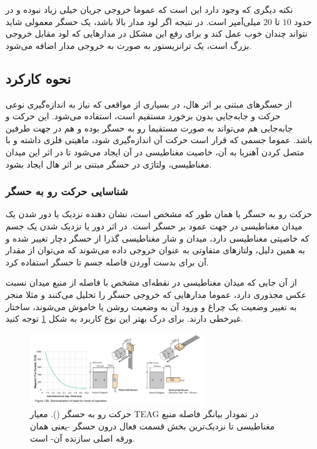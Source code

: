 \documentclass[conference]{IEEEtran-ModifiedForMVIP}
\begin{document}
نکته دیگری که وجود دارد این است که عموما خروجی جریان خیلی زیاد نبوده و در حدود $10$ تا $20$ میلی‌آمپر است. در نتیجه اگر لود مدار بالا باشد، یک حسگر معمولی شاید نتواند چندان خوب عمل کند و برای رفع این مشکل در مدار‌هایی که لود مقابل خروجی بزرگ است، یک ترانزیستور  به صورت  به خروجی مدار اضافه می‌شود. 	\cite{ele_hall_2013}


\subsection{نحوه کارکرد}

از حسگر‌های مبتنی بر اثر هال، در بسیاری از مواقعی که نیاز به اندازه‌گیری نوعی حرکت و جابه‌جایی بدون برخورد مستقیم است، استفاده می‌شود. این حرکت و جا‌به‌جایی هم می‌تواند به صورت مستقیما رو به حسگر بوده و هم در جهت طرفین باشد. عموما جسمی که قرار است حرکت‌ آن اندازه‌گیری شود، ماهیتی فلزی داشته و با متصل کردن آهنربا به آن، خاصیت مغناطیسی در آن ایجاد می‌شود تا در اثر این میدان مغناطیسی، ولتاژی در حسگر مبتنی بر اثر هال ایجاد بشود.

\subsubsection{شناسایی حرکت رو به حسگر}

حرکت رو به حسگر یا  همان طور که مشخص است، نشان دهنده نزدیک یا دور شدن یک میدان مغناطیسی در جهت عمود بر حسگر است. در اثر دور یا نزدیک شدن یک جسم که خاصیتی مغناطیسی دارد، میدان و شار مغناطیسی گذرا از حسگر دچار تغییر شده و به همین دلیل، ولتاز‌های متفاوتی به عنوان خروجی داده می‌شوند که می‌توان از مقدار آن برای بدست آوردن فاصله جسم تا حسگر استفاده کرد.

از آن جایی که میدان مغناطیسی در نقطه‌ای مشخص با فاصله از منبع میدان نسبت عکس مجذوری دارد، عموما مدارهایی که خروجی حسگر را تحلیل می‌کنند و مثلا منجر به تغییر وضعیت یک چراغ و ورود آن به وضعیت روشن یا خاموش می‌شوند، ساختار غیرخطی دارند. برای درک بهتر این نوع کاربرد به شکل
\ref{fig:4}
توجه کنید.

\begin{figure}[t]
	
	\centering 
	\includegraphics[width=75mm]{Images/head.png}
	\caption{حرکت رو به حسگر ().
		معیار TEAG در نمودار بیانگر فاصله منبع مغناطیسی تا نزدیک‌ترین بخش قسمت فعال درون حسگر -یعنی همان ورقه اصلی سازنده آن- است.
		\cite{alleg}	
	}\label{fig:4}
\end{figure}
\end{document}
